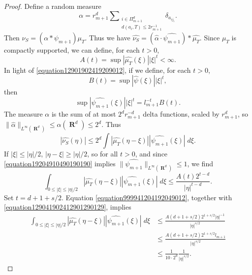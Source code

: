 \documentclass[12pt,reqno]{article}
\DeclareMathOperator{\RR}{\mathbf{R}}
\begin{document}
\begin{proof}
    Define a random measure
    \[ \alpha = r_{m+1}^d \sum\nolimits_{\substack{i \in \Pi_{m+1}^d\\d(a_i,T) \leq 2 r_{m+1}^{-1}}} \delta_{a_{ij_i}}. \]
    Then $\nu_S = (\alpha * \psi_{m+1}) \mu_T$.
    Thus we have $\widehat{\nu_S} = (\widehat{\alpha} \cdot \widehat{\psi_{m+1}}) * \widehat{\mu_T}$. Since $\mu_T$ is compactly supported, we can define, for each $t > 0$,
    \[ A(t) = \sup |\widehat{\mu_T}(\xi)| |\xi|^t < \infty. \]
    In light of \eqref{equation12901902419209012}, if we define, for each $t > 0$,
    \[ B(t) = \sup |\widehat{\psi}(\xi)| |\xi|^t, \]
    then
    \[ \sup |\widehat{\psi_{m+1}}(\xi)| |\xi|^t = l_{m+1}^{-t} B(t). \]
    The measure $\alpha$ is the sum of at most $2^d r_{m+1}^{-d}$ delta functions, scaled by $r_{m+1}^d$, so $\| \widehat{\alpha} \|_{L^\infty(\RR^d)} \leq \alpha(\RR^d) \leq 2^d$. Thus
    \begin{equation} \label{equation9942941924912912}
        |\widehat{\nu_S}(\eta)| \leq 2^d \int |\widehat{\mu_T}(\eta - \xi)| |\widehat{\psi_{m+1}}(\xi)|\; d\xi.
    \end{equation}
    If $|\xi| \leq |\eta|/2$, $|\eta - \xi| \geq |\eta|/2$, so for all $t > 0$, and since \eqref{equation19204910490190190} implies $\| \widehat{\psi_{m+1}} \|_{L^\infty(\RR^d)} \leq 1$, we find
    \begin{equation} \label{equation999941204192049012}
        \int_{0 \leq |\xi| \leq |\eta|/2} |\widehat{\mu_T}(\eta - \xi)| |\widehat{\psi_{m+1}}(\xi)|\; d\xi \leq \frac{A(t) 2^{t-d}}{|\eta|^{t-d}}.
    \end{equation}
    Set $t = d + 1 + s/2$. Equation \eqref{equation999941204192049012}, together with \eqref{equation129041902412901290129}, implies
    \begin{equation} \label{equation1111902491209012}
    \begin{split}
        \int_{0 \leq |\xi| \leq |\eta|/2} |\widehat{\mu_T}(\eta - \xi)| |\widehat{\psi_{m+1}}(\xi)|\; d\xi &\leq \frac{A(d + 1 + s/2) 2^{1 + s/2} |\eta|^{-1}}{|\eta|^{s/2}}\\
        &\leq \frac{A(d + 1 + s/2) 2^{1 + s/2} l_{m+1}}{|\eta|^{s/2}}\\
        &\leq \frac{1}{10 \cdot 2^d} \frac{1}{|\eta|^{s/2}}.

\end{split}
\end{equation}
\end{proof}
\end{document}
